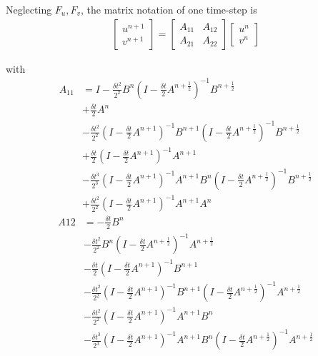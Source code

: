 \documentclass[12pt]{article}
\begin{document}
Neglecting $F_u, F_v$, the matrix notation of one time-step is
\begin{align}
  \begin{bmatrix}
    u^{n+1} \\ v^{n+1}
  \end{bmatrix} = 
  \begin{bmatrix}
    A_{11} & A_{12} \\ A_{21} & A_{22}
  \end{bmatrix}
  \begin{bmatrix}
    u^n \\ v^n
  \end{bmatrix} 
\end{align}

with
\begin{align}
   A_{11} &=  I - \frac{\delta t^2}{2^2}B^{n}(I - \frac{\delta t}{2}A^{n+\frac 12})^{-1}B^{n+\frac 12} \\
   & + \frac{\delta t}{2}A^{n}  \\
       & - \frac{\delta t^2}{2^2}(I - \frac{\delta t}{2}A^{n+1})^{-1}B^{n+1}(I - \frac{\delta t}{2}A^{n+\frac 12})^{-1}B^{n+\frac 12}   \\
       & + \frac{\delta t}{2}(I - \frac{\delta t}{2}A^{n+1})^{-1}A^{n+1} \\
       & - \frac{\delta t^3}{2^3}(I - \frac{\delta t}{2}A^{n+1})^{-1}A^{n+1}B^{n}(I - \frac{\delta t}{2}A^{n+\frac 12})^{-1}B^{n+\frac 12} \\
       & + \frac{\delta t^2}{2^2}(I - \frac{\delta t}{2}A^{n+1})^{-1}A^{n+1}A^{n}
\end{align}
\begin{align}
  A{12} &= -\frac{\delta t}{2}B^{n} \\
    & - \frac{\delta t^2}{2^2}B^{n}(I - \frac{\delta t}{2}A^{n+\frac 12})^{-1}A^{n+\frac 12} \\
    & - \frac{\delta t}{2}(I - \frac{\delta t}{2}A^{n+1})^{-1}B^{n+1}  \\
    & - \frac{\delta t^2}{2^2}(I - \frac{\delta t}{2}A^{n+1})^{-1}B^{n+1}(I - \frac{\delta t}{2}A^{n+\frac 12})^{-1}A^{n+\frac 12} \\
    & - \frac{\delta t^2}{2^2}(I - \frac{\delta t}{2}A^{n+1})^{-1}A^{n+1}B^{n} \\
    & - \frac{\delta t^3}{2^3}(I - \frac{\delta t}{2}A^{n+1})^{-1}A^{n+1}B^{n}(I - \frac{\delta t}{2}A^{n+\frac 12})^{-1}A^{n+\frac 12} 
\end{align}
\end{document}
